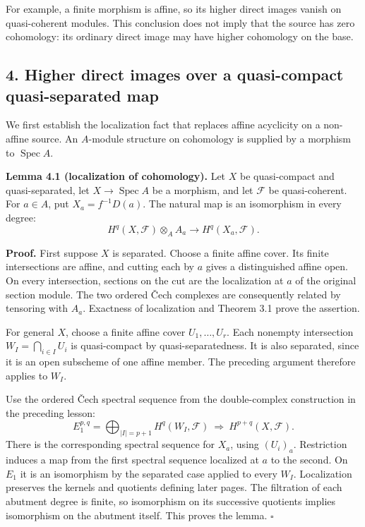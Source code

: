 \documentclass[11pt]{article}
\begin{document}
For example, a finite morphism is affine, so its higher direct images
vanish on quasi-coherent modules. This conclusion does not imply that
the source has zero cohomology: its ordinary direct image may have
higher cohomology on the base.

\subsection{4. Higher direct images over a quasi-compact quasi-separated
map}\label{higher-direct-images-over-a-quasi-compact-quasi-separated-map}

We first establish the localization fact that replaces affine acyclicity
on a non-affine source. An \(A\)-module structure on cohomology is
supplied by a morphism to \(\operatorname{Spec}A\).

\textbf{Lemma 4.1 (localization of cohomology).} Let \(X\) be
quasi-compact and quasi-separated, let \(X\to\operatorname{Spec}A\) be a
morphism, and let \(\mathcal F\) be quasi-coherent. For \(a\in A\), put
\(X_a=f^{-1}D(a)\). The natural map is an isomorphism in every degree:
\[
H^q(X,\mathcal F)\otimes_A A_a
\longrightarrow H^q(X_a,\mathcal F).
\]

\textbf{Proof.} First suppose \(X\) is separated. Choose a finite affine
cover. Its finite intersections are affine, and cutting each by \(a\)
gives a distinguished affine open. On every intersection, sections on
the cut are the localization at \(a\) of the original section module.
The two ordered Čech complexes are consequently related by tensoring
with \(A_a\). Exactness of localization and Theorem 3.1 prove the
assertion.

For general \(X\), choose a finite affine cover \(U_1,\ldots,U_r\). Each
nonempty intersection \(W_I=\bigcap_{i\in I}U_i\) is quasi-compact by
quasi-separatedness. It is also separated, since it is an open subscheme
of one affine member. The preceding argument therefore applies to
\(W_I\).

Use the ordered Čech spectral sequence from the double-complex
construction in the preceding lesson: \[
E_1^{p,q}=\bigoplus_{|I|=p+1}H^q(W_I,\mathcal F)
\ \Longrightarrow\ H^{p+q}(X,\mathcal F).
\] There is the corresponding spectral sequence for \(X_a\), using
\((U_i)_a\). Restriction induces a map from the first spectral sequence
localized at \(a\) to the second. On \(E_1\) it is an isomorphism by the
separated case applied to every \(W_I\). Localization preserves the
kernels and quotients defining later pages. The filtration of each
abutment degree is finite, so isomorphism on its successive quotients
implies isomorphism on the abutment itself. This proves the lemma.
\(\square\)
\end{document}
